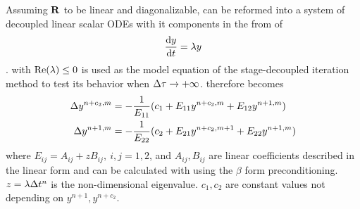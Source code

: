 Assuming $\mathbf{R}$ to be linear and diagonalizable,
 can be reformed into a system of decoupled linear scalar ODEs 
with it components in the from of
\begin{equation}
    \label{eq:odeScalarTest}
    \derivative{y}{t} = \lambda y
\end{equation}.
 with $\mathrm{Re}(\lambda)\leq 0$
is used as the model equation 
of the stage-decoupled iteration method
to test its behavior when
${\Delta} \tau \rightarrow +\infty$.
 therefore becomes
\begin{equation}
    \begin{aligned}
        {\Delta} y^{n+c_2, m} & = -\frac{1}{ E_{11} } (c_1 + E_{11}  y^{n+c_2, m}+ E_{12}  y^{n+1, m})     \\
        {\Delta} y^{n+1, m}   & = -\frac{1}{ E_{22} } (c_2 + E_{21}  y^{n+c_2, m + 1}+ E_{22}  y^{n+1, m})
    \end{aligned}
    \label{eq:scalarGS}
\end{equation}
where $E_{ij}=A_{ij}+zB_{ij},\ i,j=1,2$, and $A_{ij}, B_{ij}$ are
linear coefficients described in the linear form 
and can be calculated with  using the $\beta$ form
preconditioning. $z=\lambda{\Delta} t^n$ is the non-dimensional eigenvalue.
$c_1,c_2$ are constant values not depending  on $y^{n+1}, y^{n+c_2}$.

